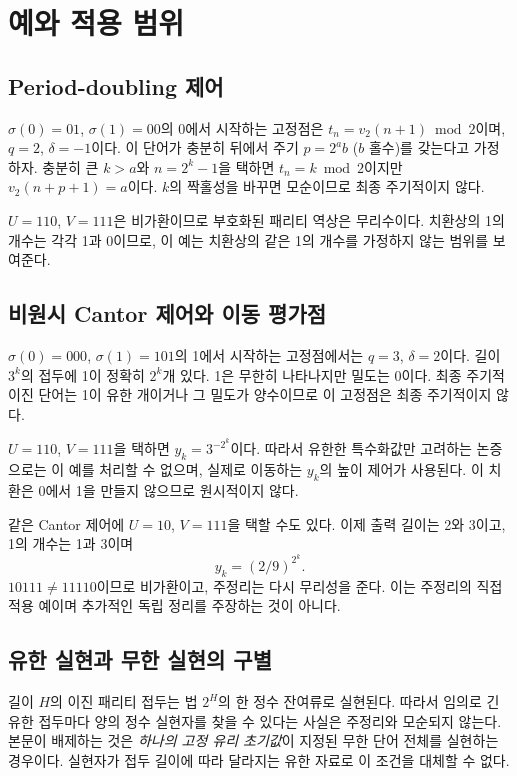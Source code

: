 \documentclass[11pt,a4paper]{article}
\theoremstyle{koreanplain}
\newcommand{\vTwo}{v_2}
\begin{document}
\section{예와 적용 범위}

\subsection{Period-doubling 제어}

$\sigma(0)=01$, $\sigma(1)=00$의 0에서 시작하는 고정점은
$t_n=\vTwo(n+1)\bmod2$이며, $q=2$, $\delta=-1$이다. 이 단어가 충분히 뒤에서 주기 $p=2^ab$ ($b$ 홀수)를 갖는다고 가정하자. 충분히 큰 $k>a$와 $n=2^k-1$을 택하면 $t_n=k\bmod2$이지만 $\vTwo(n+p+1)=a$이다. $k$의 짝홀성을 바꾸면 모순이므로 최종 주기적이지 않다.

$U=110$, $V=111$은 비가환이므로 부호화된 패리티 역상은 무리수이다. 치환상의 1의 개수는 각각 1과 0이므로, 이 예는 치환상의 같은 1의 개수를 가정하지 않는 범위를 보여준다.

\subsection{비원시 Cantor 제어와 이동 평가점}

$\sigma(0)=000$, $\sigma(1)=101$의 1에서 시작하는 고정점에서는 $q=3$, $\delta=2$이다. 길이 $3^k$의 접두에 1이 정확히 $2^k$개 있다. 1은 무한히 나타나지만 밀도는 0이다. 최종 주기적 이진 단어는 1이 유한 개이거나 그 밀도가 양수이므로 이 고정점은 최종 주기적이지 않다.

$U=110$, $V=111$을 택하면 $y_k=3^{-2^k}$이다. 따라서 유한한 특수화값만 고려하는 논증으로는 이 예를 처리할 수 없으며, 실제로 이동하는 $y_k$의 높이 제어가 사용된다. 이 치환은 0에서 1을 만들지 않으므로 원시적이지 않다.

같은 Cantor 제어에 $U=10$, $V=111$을 택할 수도 있다. 이제 출력 길이는 2와 3이고, 1의 개수는 1과 3이며
\[
y_k=(2/9)^{2^k}.
\]
$10111\ne11110$이므로 비가환이고, 주정리는 다시 무리성을 준다. 이는 주정리의 직접 적용 예이며 추가적인 독립 정리를 주장하는 것이 아니다.

\subsection{유한 실현과 무한 실현의 구별}

길이 $H$의 이진 패리티 접두는 법 $2^H$의 한 정수 잔여류로 실현된다. 따라서 임의로 긴 유한 접두마다 양의 정수 실현자를 찾을 수 있다는 사실은 주정리와 모순되지 않는다. 본문이 배제하는 것은 \emph{하나의 고정 유리 초기값}이 지정된 무한 단어 전체를 실현하는 경우이다. 실현자가 접두 길이에 따라 달라지는 유한 자료로 이 조건을 대체할 수 없다.
\end{document}
